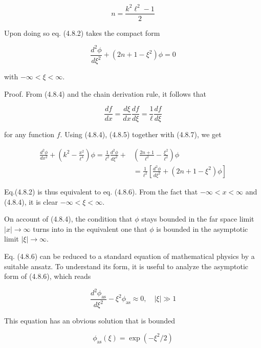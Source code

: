 \documentclass{article}
\begin{document}
\begin{equation*}
n=\frac{k^{2} \ell^{2}-1}{2} \tag{4.8.5}
\end{equation*}
 

Upon doing so eq. (4.8.2) takes the compact form
 
\begin{equation*}
\frac{d^{2} \phi}{d \xi^{2}}+\left(2 n+1-\xi^{2}\right) \phi=0 \tag{4.8.6}
\end{equation*}
 
with $-\infty<\xi<\infty$.

Proof. From (4.8.4) and the chain derivation rule, it follows that
 
\begin{equation*}
\frac{d f}{d x}=\frac{d \xi}{d x} \frac{d f}{d \xi}=\frac{1}{\ell} \frac{d f}{d \xi} \tag{4.8.7}
\end{equation*}
 
for any function $f$. Using (4.8.4), (4.8.5) together with (4.8.7), we get
 
\begin{align*}
\frac{d^{2} \phi}{d x^{2}}+\left(k^{2}-\frac{x^{2}}{\ell^{4}}\right) \phi=\frac{1}{\ell^{2}} \frac{d^{2} \phi}{d \xi^{2}}+ & \left(\frac{2 n+1}{\ell^{2}}-\frac{\xi^{2}}{\ell^{2}}\right) \phi  \tag{4.8.8}\\
& =\frac{1}{\ell^{2}}\left[\frac{d^{2} \phi}{d \xi^{2}}+\left(2 n+1-\xi^{2}\right) \phi\right]
\end{align*}
 

Eq.(4.8.2) is thus equivalent to eq. (4.8.6). From the fact that $-\infty<x<\infty$ and (4.8.4), it is clear $-\infty<\xi<\infty$.

On account of (4.8.4), the condition that $\phi$ stays bounded in the far space limit $|x| \rightarrow \infty$ turns into in the equivalent one that $\phi$ is bounded in the asymptotic limit $|\xi| \rightarrow \infty$.

Eq. (4.8.6) can be reduced to a standard equation of mathematical physics by a suitable ansatz. To understand its form, it is useful to analyze the asymptotic form of (4.8.6), which reads
 
\begin{equation*}
\frac{d^{2} \phi_{\mathrm{as}}}{d \xi^{2}}-\xi^{2} \phi_{\mathrm{as}} \approx 0, \quad|\xi| \gg 1 \tag{4.8.9}
\end{equation*}
 

This equation has an obvious solution that is bounded
 
\begin{equation*}
\phi_{\mathrm{as}}(\xi)=\exp \left(-\xi^{2} / 2\right) \tag{4.8.10}
\end{equation*}
 
\end{document}

